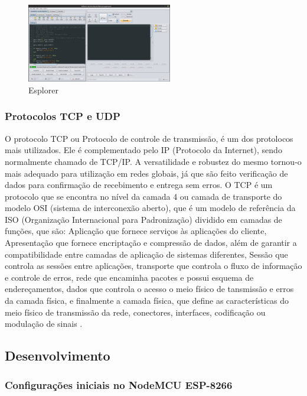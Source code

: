 \documentclass[journal]{IEEEtran}
\begin{document}
\begin{figure}[h]
\centering
\includegraphics[width=2.5in]{esplorer}
\caption{Esplorer \cite{ESPlorer}}
\label{esplorer}
\end{figure}

\subsubsection{Protocolos TCP e UDP}
O protocolo TCP ou Protocolo de controle de transmissão, é um dos protolocos mais utilizados. Ele é complementado pelo IP (Protocolo da Internet), sendo normalmente chamado de TCP/IP. A versatilidade e robustez do mesmo tornou-o mais adequado para utilização em redes globais, já que são feito verificação de dados para confirmação de recebimento e entrega sem erros. O TCP é um protocolo que se encontra no nível da camada 4 ou camada de transporte do modelo OSI (sistema de interconexão aberto), que é um modelo de referência da ISO (Organização Internacional para Padronização) dividido em camadas de funções, que são: Aplicação que fornece serviços às aplicações do cliente, Apresentação que fornece encriptação e compressão de dados, além de garantir a compatibilidade entre camadas de aplicação de sistemas diferentes, Sessão que controla as sessões entre aplicações, transporte que controla o fluxo de informação e controle de erros, rede que encaminha pacotes e possui esquema de endereçamentos, dados que controla o acesso o meio físico de tansmissão e erros da camada física, e finalmente a camada física, que define as características do meio físico de transmissão da rede, conectores, interfaces, codificação ou modulação de sinais \cite{pplwareosi}\cite{VintonTCP}.







\subsection{Desenvolvimento}
\subsubsection{Configurações iniciais no NodeMCU ESP-8266}
\end{document}
